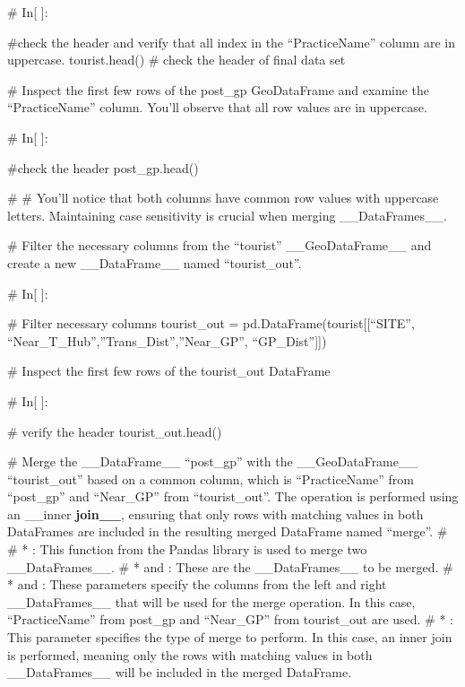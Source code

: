 \documentclass[letterpaper,10pt,english]{sphinxmanual}
\begin{document}
\sphinxAtStartPar
\# In{[} {]}:

\sphinxAtStartPar
\#check the header and verify that all index in the “PracticeName” column are in uppercase.
tourist.head() \# check the header of final data set

\sphinxAtStartPar
\# Inspect the first few rows of the post\_gp GeoDataFrame and examine the “PracticeName” column. You’ll observe that all row values are in uppercase.

\sphinxAtStartPar
\# In{[} {]}:

\sphinxAtStartPar
\#check the header
post\_gp.head()

\sphinxAtStartPar
\#
\# You’ll notice that both columns have common row values with uppercase letters. Maintaining case sensitivity is crucial when merging \_\_DataFrames\_\_.

\sphinxAtStartPar
\# Filter the necessary columns from the “tourist” \_\_GeoDataFrame\_\_ and create a new \_\_DataFrame\_\_ named “tourist\_out”.

\sphinxAtStartPar
\# In{[} {]}:

\sphinxAtStartPar
\# Filter necessary columns
tourist\_out = pd.DataFrame(tourist{[}{[}“SITE”, “Near\_T\_Hub”,”Trans\_Dist”,”Near\_GP”, “GP\_Dist”{]}{]})

\sphinxAtStartPar
\# Inspect the first few rows of the tourist\_out DataFrame

\sphinxAtStartPar
\# In{[} {]}:

\sphinxAtStartPar
\# verify the header
tourist\_out.head()

\sphinxAtStartPar
\# Merge the \_\_DataFrame\_\_ “post\_gp” with the \_\_GeoDataFrame\_\_ “tourist\_out” based on a common column, which is “PracticeName” from “post\_gp” and “Near\_GP” from “tourist\_out”. The  operation is performed using an \_\_inner {\color{red}\bfseries{}join\_\_}, ensuring that only rows with matching values in both DataFrames are included in the resulting merged DataFrame named “merge”.
\#
\# * : This function from the Pandas library is used to merge two \_\_DataFrames\_\_.
\# *  and : These are the \_\_DataFrames\_\_ to be merged.
\# *  and : These parameters specify the columns from the left and right \_\_DataFrames\_\_ that will be used for the merge operation. In this case, “PracticeName” from post\_gp and “Near\_GP” from tourist\_out are used.
\# * : This parameter specifies the type of merge to perform. In this case, an inner join is performed, meaning only the rows with matching values in both \_\_DataFrames\_\_ will be included in the merged DataFrame.
\end{document}
